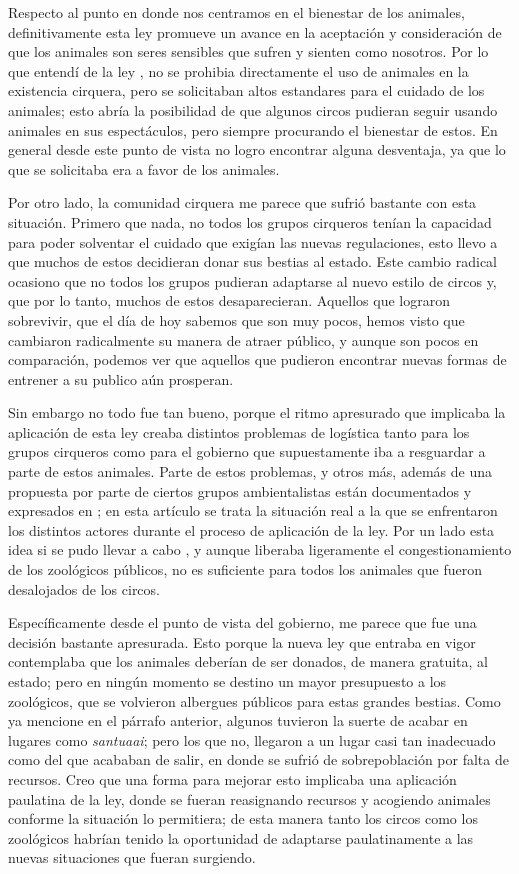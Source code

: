\documentclass[12pt]{article}
\begin{document}
 \par Respecto al punto en donde nos centramos en el bienestar de los animales, definitivamente esta ley promueve un avance en la aceptación y consideración de que los animales son seres sensibles que sufren y sienten como nosotros. Por lo que entendí de la ley \cite{ley}, no se prohibia directamente el uso de animales en la existencia cirquera, pero se solicitaban altos estandares para el cuidado de los animales; esto abría la posibilidad de que algunos circos pudieran seguir usando animales en sus espectáculos, pero siempre procurando el bienestar de estos. En general desde este punto de vista no logro encontrar alguna desventaja, ya que lo que se solicitaba era a favor de los animales.
 \par Por otro lado, la comunidad cirquera me parece que sufrió bastante con esta situación. Primero que nada, no todos los grupos cirqueros tenían la capacidad para poder solventar el cuidado que exigían las nuevas regulaciones, esto llevo a que muchos de estos decidieran donar sus bestias al estado. Este cambio radical ocasiono que no todos los grupos pudieran adaptarse al nuevo estilo de circos y, que por lo tanto, muchos de estos desaparecieran. Aquellos que lograron sobrevivir, que el día de hoy sabemos que son muy pocos, hemos visto que cambiaron radicalmente su manera de atraer público, y aunque son pocos en comparación, podemos ver que aquellos que pudieron encontrar nuevas formas de entrener a su publico aún prosperan. 
 \par Sin embargo no todo fue tan bueno, porque el ritmo apresurado que implicaba la aplicación de esta ley creaba distintos problemas de logística tanto para los grupos cirqueros como para el gobierno que supuestamente iba a resguardar a parte de estos animales. Parte de estos problemas, y otros más, además de una propuesta por parte de ciertos grupos ambientalistas están documentados y expresados en \cite{santuario}; en esta artículo se trata la situación real a la que se enfrentaron los distintos actores durante el proceso de aplicación de la ley. Por un lado esta idea si se pudo llevar a cabo  \cite{santuai}, y aunque liberaba ligeramente el congestionamiento de los zoológicos públicos, no es suficiente para todos los animales que fueron desalojados de los circos.
 \par Específicamente desde el punto de vista del gobierno, me parece que fue una decisión bastante apresurada. Esto porque la nueva ley que entraba en vigor contemplaba que los animales deberían de ser donados, de manera gratuita, al estado; pero en ningún momento se destino un mayor presupuesto a los zoológicos, que se volvieron albergues públicos para estas grandes bestias. Como ya mencione en el párrafo anterior, algunos tuvieron la suerte de acabar en lugares como \textit{santuaai}; pero los que no, llegaron a un lugar casi tan inadecuado como del que acababan de salir, en donde se sufrió de sobrepoblación por falta de recursos. Creo que una forma para mejorar esto implicaba una aplicación paulatina de la ley, donde se fueran reasignando recursos y acogiendo animales conforme la situación lo permitiera; de esta manera tanto los circos como los zoológicos habrían tenido la oportunidad de adaptarse paulatinamente a las nuevas situaciones que fueran surgiendo.
\end{document}
